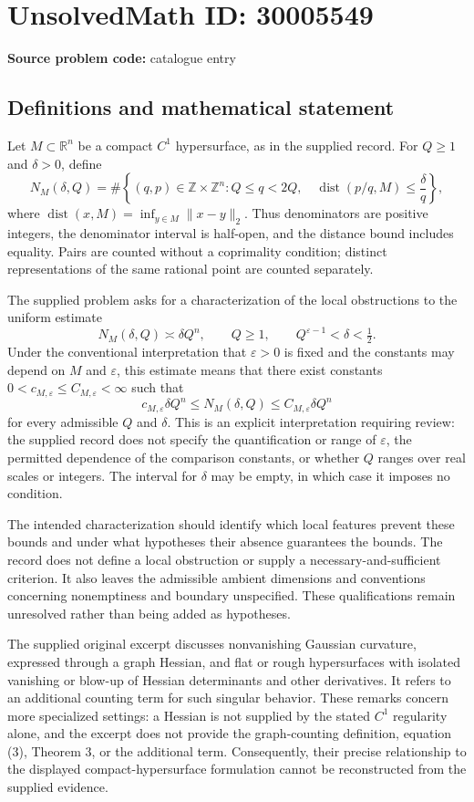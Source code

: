 \documentclass[11pt]{article}
\newcommand{\Z}{\mathbb{Z}}
\newcommand{\R}{\mathbb{R}}
\begin{document}
\section*{UnsolvedMath ID: 30005549}
\textbf{Source problem code:} catalogue entry
\subsection{Definitions and mathematical statement}
Let \(M\subset\R^n\) be a compact \(C^1\) hypersurface, as in the supplied record. For \(Q\geq1\) and \(\delta>0\), define
\[
N_M(\delta,Q)=\#\left\{(q,p)\in\Z\times\Z^n: Q\leq q<2Q,\quad \operatorname{dist}(p/q,M)\leq\frac{\delta}{q}\right\},
\]
where \(\operatorname{dist}(x,M)=\inf_{y\in M}\|x-y\|_2\). Thus denominators are positive integers, the denominator interval is half-open, and the distance bound includes equality. Pairs are counted without a coprimality condition; distinct representations of the same rational point are counted separately.

The supplied problem asks for a characterization of the local obstructions to the uniform estimate
\[
N_M(\delta,Q)\asymp\delta Q^n,
\qquad Q\geq1,\qquad Q^{\varepsilon-1}<\delta<\tfrac12.
\]
Under the conventional interpretation that \(\varepsilon>0\) is fixed and the constants may depend on \(M\) and \(\varepsilon\), this estimate means that there exist constants \(0<c_{M,\varepsilon}\leq C_{M,\varepsilon}<\infty\) such that
\[
c_{M,\varepsilon}\delta Q^n\leq N_M(\delta,Q)\leq C_{M,\varepsilon}\delta Q^n
\]
for every admissible \(Q\) and \(\delta\). This is an explicit interpretation requiring review: the supplied record does not specify the quantification or range of \(\varepsilon\), the permitted dependence of the comparison constants, or whether \(Q\) ranges over real scales or integers. The interval for \(\delta\) may be empty, in which case it imposes no condition.

The intended characterization should identify which local features prevent these bounds and under what hypotheses their absence guarantees the bounds. The record does not define a local obstruction or supply a necessary-and-sufficient criterion. It also leaves the admissible ambient dimensions and conventions concerning nonemptiness and boundary unspecified. These qualifications remain unresolved rather than being added as hypotheses.

The supplied original excerpt discusses nonvanishing Gaussian curvature, expressed through a graph Hessian, and flat or rough hypersurfaces with isolated vanishing or blow-up of Hessian determinants and other derivatives. It refers to an additional counting term for such singular behavior. These remarks concern more specialized settings: a Hessian is not supplied by the stated \(C^1\) regularity alone, and the excerpt does not provide the graph-counting definition, equation (3), Theorem 3, or the additional term. Consequently, their precise relationship to the displayed compact-hypersurface formulation cannot be reconstructed from the supplied evidence.
\end{document}
